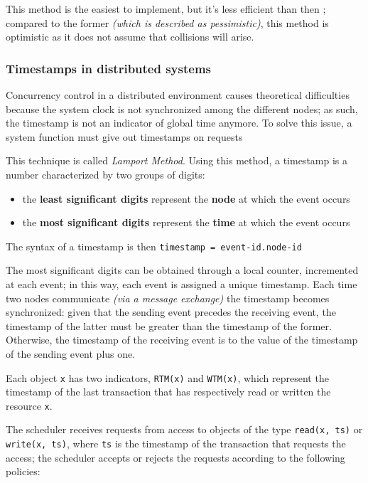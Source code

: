 \documentclass[english]{article}
\begin{document}
\bigskip
This method is the easiest to implement, but it's less efficient than then \TPL;
compared to the former \textit{(which is described as pessimistic)}, this method is optimistic as it does not assume that collisions will arise.

\subsubsection{Timestamps in distributed systems}

Concurrency control in a distributed environment causes theoretical difficulties because the system clock is not synchronized among the different nodes;
as such, the timestamp is not an indicator of global time anymore.
To solve this issue, a system function must give out timestamps on requests

This technique is called \textit{Lamport Method}.
Using this method, a timestamp is a number characterized by two groups of digits:

\begin{itemize}
  \item the \textbf{least significant digits} represent the \textbf{node} at which the event occurs
  \item the \textbf{most significant digits} represent the \textbf{time} at which the event occurs
\end{itemize}

The syntax of a timestamp is then \texttt{timestamp = event-id.node-id}

\bigskip
The most significant digits can be obtained through a local counter, incremented at each event; in this way, each event is assigned a unique timestamp.
Each time two nodes communicate \textit{(via a message exchange)} the timestamp becomes synchronized: given that the sending event precedes the receiving event, the timestamp of the latter must be greater than the timestamp of the former.
Otherwise, the timestamp of the receiving event is  to the value of the timestamp of the sending event plus one.

\bigskip
Each object \texttt{x} has two indicators, \texttt{RTM(x)} and \texttt{WTM(x)}, which represent the timestamp of the last transaction that has respectively read or written the resource \texttt{x}.

The scheduler receives requests from access to objects of the type \texttt{read(x, ts)} or \texttt{write(x, ts)}, where \texttt{ts} is the timestamp of the transaction that requests the access; the scheduler accepts or rejects the requests according to the following policies:
\end{document}
